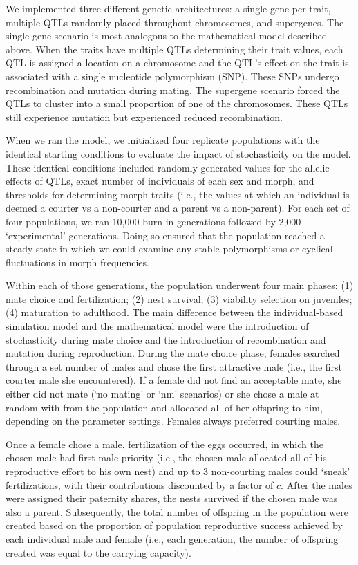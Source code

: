 \documentclass[11pt,]{article}
\begin{document}
We implemented three different genetic architectures: a single gene per
trait, multiple QTLs randomly placed throughout chromosomes, and
supergenes. The single gene scenario is most analogous to the
mathematical model described above. When the traits have multiple QTLs
determining their trait values, each QTL is assigned a location on a
chromosome and the QTL's effect on the trait is associated with a single
nucleotide polymorphism (SNP). These SNPs undergo recombination and
mutation during mating. The supergene scenario forced the QTLs to
cluster into a small proportion of one of the chromosomes. These QTLs
still experience mutation but experienced reduced recombination.

When we ran the model, we initialized four replicate populations with
the identical starting conditions to evaluate the impact of
stochasticity on the model. These identical conditions included
randomly-generated values for the allelic effects of QTLs, exact number
of individuals of each sex and morph, and thresholds for determining
morph traits (i.e., the values at which an individual is deemed a
courter vs a non-courter and a parent vs a non-parent). For each set of
four populations, we ran 10,000 burn-in generations followed by 2,000
`experimental' generations. Doing so ensured that the population reached
a steady state in which we could examine any stable polymorphisms or
cyclical fluctuations in morph frequencies.

Within each of those generations, the population underwent four main
phases: (1) mate choice and fertilization; (2) nest survival; (3)
viability selection on juveniles; (4) maturation to adulthood. The main
difference between the individual-based simulation model and the
mathematical model were the introduction of stochasticity during mate
choice and the introduction of recombination and mutation during
reproduction. During the mate choice phase, females searched through a
set number of males and chose the first attractive male (i.e., the first
courter male she encountered). If a female did not find an acceptable
mate, she either did not mate (`no mating' or `nm' scenarios) or she
chose a male at random with from the population and allocated
all of her offspring to him, depending on the parameter settings.
Females always preferred courting males.

Once a female chose a male, fertilization of the eggs occurred, in which
the chosen male had first male priority (i.e., the chosen male allocated
all of his reproductive effort to his own nest) and up to 3 non-courting
males could `sneak' fertilizations, with their contributions discounted
by a factor of \(c\). After the males were assigned their paternity
shares, the nests survived if the chosen male was also a parent.
Subsequently, the total number of offspring in the population were
created based on the proportion of population reproductive success
achieved by each individual male and female (i.e., each generation, the
number of offspring created was equal to the carrying capacity).
\end{document}

